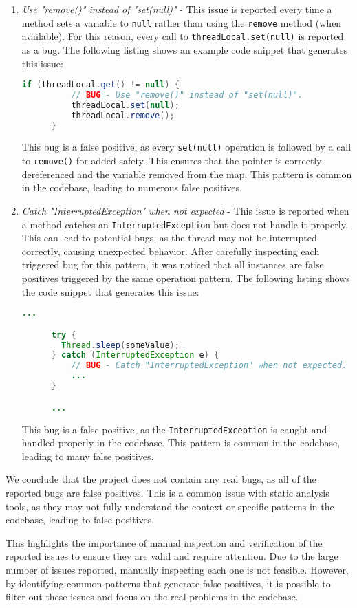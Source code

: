 \begin{enumerate}
  \item \textit{Use "remove()" instead of "set(null)"} - This issue is reported every time a method sets a variable to \texttt{null} rather than using the \texttt{remove} method (when available). For this reason, every call to \texttt{threadLocal.set(null)} is reported as a bug. The following listing shows an example code snippet that generates this issue:

    \begin{lstlisting}[language=Java]
      if (threadLocal.get() != null) {
          // BUG - Use "remove()" instead of "set(null)".
          threadLocal.set(null);
          threadLocal.remove();
      }
    \end{lstlisting}

    \noindent This bug is a false positive, as every \texttt{set(null)} operation is followed by a call to \texttt{remove()} for added safety. This ensures that the pointer is correctly dereferenced and the variable removed from the map. This pattern is common in the codebase, leading to numerous false positives.

  \item \textit{Catch "InterruptedException" when not expected} - This issue is reported when a method catches an \texttt{InterruptedException} but does not handle it properly. This can lead to potential bugs, as the thread may not be interrupted correctly, causing unexpected behavior. After carefully inspecting each triggered bug for this pattern, it was noticed that all instances are false positives triggered by the same operation pattern. The following listing shows the code snippet that generates this issue:
    \begin{lstlisting}[language=Java]
      ...

      try {
        Thread.sleep(someValue);
      } catch (InterruptedException e) {
          // BUG - Catch "InterruptedException" when not expected.
          ...
      }

      ...
    \end{lstlisting}
    \noindent This bug is a false positive, as the \texttt{InterruptedException} is caught and handled properly in the codebase. This pattern is common in the codebase, leading to many false positives.
\end{enumerate}

\noindent We conclude that the project does not contain any real bugs, as all of the reported bugs are false positives. This is a common issue with static analysis tools, as they may not fully understand the context or specific patterns in the codebase, leading to false positives.

This highlights the importance of manual inspection and verification of the reported issues to ensure they are valid and require attention. Due to the large number of issues reported, manually inspecting each one is not feasible. However, by identifying common patterns that generate false positives, it is possible to filter out these issues and focus on the real problems in the codebase.

